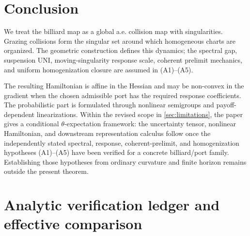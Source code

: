 \documentclass[12pt, letterpaper]{amsart}
\theoremstyle{plain}
\theoremstyle{definition}
\theoremstyle{remark}
\begin{document}
\section{Conclusion}
\label{sec:conclusion}

We treat the billiard map as a global a.e. collision map with singularities.
Grazing collisions form the singular set around which homogeneous charts are
organized.  The geometric construction defines this dynamics; the spectral
gap, suspension UNI, moving-singularity response scale, coherent prelimit
mechanics, and uniform homogenization closure are assumed in
\textup{(A1)--(A5)}.

The resulting Hamiltonian is affine in the Hessian and may be non-convex in the gradient when the chosen admissible port has the required response coefficients.  The probabilistic part is formulated through nonlinear semigroups and payoff-dependent linearizations.  Within the revised scope in \cref{sec:limitations}, the paper gives a conditional $\theta$-expectation framework: the uncertainty tensor, nonlinear Hamiltonian, and downstream representation calculus follow once the independently stated spectral, response, coherent-prelimit, and homogenization hypotheses \textup{(A1)--(A5)} have been verified for a concrete billiard/port family.  Establishing those hypotheses from ordinary curvature and finite horizon remains outside the present theorem.

\appendix
\renewcommand{\thesection}{A.\arabic{section}}
\setcounter{section}{0}

\section{Analytic verification ledger and effective comparison}
\label{app:comparison}
\end{document}
